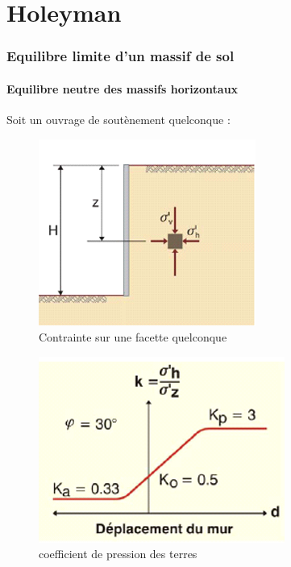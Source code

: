 \part{Holeyman}

\section{Equilibre limite d'un massif de sol}

    \subsection{Equilibre neutre des massifs horizontaux}

    Soit un ouvrage de soutènement quelconque : 
        \begin{multicols}{2}
            \begin{figure}[h!]
            \includegraphics[scale=1]{Holeyman/images/H1.PNG}
            \caption{Contrainte sur une facette quelconque}
            \end{figure}
            \vfill\null\columnbreak
            \begin{figure}[h!]
            \includegraphics[scale=1]{Holeyman/images/H2.PNG}
            \caption{coefficient de pression des terres}
            \end{figure}
        \end{multicols}
    
